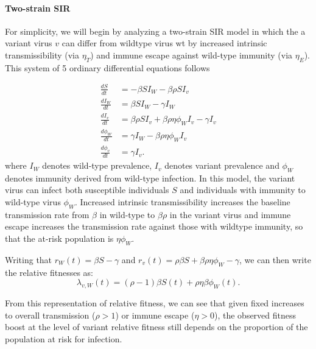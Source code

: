 \documentclass[12pt,oneside,letterpaper]{article}
\newcommand{\wt}{W}
\newcommand{\varEscape}{\eta}
\newcommand{\varTransmission}{\rho}
\begin{document}
\paragraph{Two-strain SIR}%

For simplicity, we will begin by analyzing a two-strain SIR model in which the a variant virus $v$ can differ from wildtype virus wt by increased intrinsic transmissibility (via $\varEscape_{T}$) and immune escape against wild-type immunity (via $\varEscape_{E}$).
This system of 5 ordinary differential equations follows

\begin{align*}
    \frac{d S}{d t} &= - \beta S I_{\wt} - \beta \varTransmission S I_{v}\\
    \frac{d I_{\wt}}{dt} &= \beta S I_{\wt} - \gamma I_{\wt}\\
    \frac{d I_{v}}{dt} &= \beta \varTransmission S I_{v} + \beta \varTransmission \varEscape \phi_{\wt} I_{v} - \gamma I_{v}\\
    \frac{d \phi_{\wt}}{dt} &= \gamma I_{\wt} - \beta \varTransmission \varEscape \phi_{\wt} I_{v}\\
    \frac{d \phi_{v}}{dt} &= \gamma I_{v}.
\end{align*}
where $I_{\wt}$ denotes wild-type prevalence, $I_{v}$ denotes variant prevalence and $\phi_{\wt}$ denotes immunity derived from wild-type infection.
In this model, the variant virus can infect both susceptible individuals $S$ and individuals with immunity to wild-type virus $\phi_{\wt}$.
Increased intrinsic transmissibility increases the baseline transmission rate from $\beta$ in wild-type to $\beta \varTransmission$ in the variant virus and immune escape increases the transmission rate against those with wildtype immunity, so that the at-risk population is $\varEscape \phi_{\wt}$.

Writing that $r_{\wt}(t) = \beta S - \gamma$ and $r_{v}(t) = \varTransmission \beta  S + \beta \varTransmission \varEscape \phi_{\wt} - \gamma$, we can then write the relative fitnesses as:
\begin{equation} \label{eq:two_strain_relative_fitness}
\lambda_{v,\wt}(t) = (\varTransmission - 1)\beta S(t) + \varTransmission \varEscape \beta \phi_{\wt}(t).
\end{equation}

From this representation of relative fitness, we can see that given fixed increases to overall transmission ($\varTransmission > 1$) or immune escape ($\varEscape > 0$), the observed fitness boost at the level of variant relative fitness still depends on the proportion of the population at risk for infection.
\end{document}
